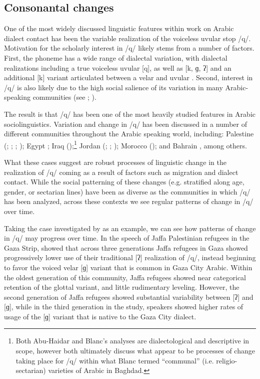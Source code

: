 \documentclass[output=paper]{langsci/langscibook}
\begin{document}
 
 \subsection{Consonantal changes}


One of the most widely discussed linguistic features within work on Arabic dialect contact has been the variable realization of the voiceless uvular stop /q/. Motivation for the scholarly interest in /q/ likely stems from a number of factors. First, the phoneme has a wide range of dialectal variation, with dialectal realizations including a true voiceless uvular [q], as well as [k, ɡ, ʔ] and an additional [k] variant articulated between a velar and uvular \citep{Shahin2011}. Second, interest in /q/ is also likely due to the high social salience of its variation in many Arabic-speaking communities (see \citealt{Hachimi2012}; \citealt{CotterHoresh2015}). 

  The result is that /q/ has been one of the most heavily studied features in Arabic sociolinguistics. Variation and change in /q/ has been discussed in a number of different communities throughout the Arabic speaking world, including: Palestine (\citealt{AbdEl-Jawad1987}; \citealt{Al-Shareef2002}; \citealt{CotterHoresh2015}; \citealt{Cotter2016}); Egypt \citep{Haeri1997}; Iraq (\citealt{Blanc1964,Abu-Haidar1991});\footnote{Both Abu-Haidar and Blanc’s analyses are dialectological and descriptive in scope, however both ultimately discuss what appear to be processes of change taking place for /q/ within what Blanc termed “communal” (i.e. religio-sectarian) varieties of Arabic in Baghdad.}  Jordan (\citealt{AbdEl-Jawad1981}; \citealt{Al-Wer2007}; \citealt{Al-WerHerin2011}); Morocco (\citealt{Hachimi2007,Hachimi2012}); and Bahrain \citep{Holes1987}, among others. 

  What these cases suggest are robust processes of linguistic change in the realization of /q/ coming as a result of factors such as migration and dialect contact. While the social patterning of these changes (e.g. stratified along age, gender, or sectarian lines) have been as diverse as the communities in which /q/ has been analyzed, across these contexts we see regular patterns of change in /q/ over time. 

  Taking the case investigated by \citet{Cotter2016} as an example, we can see how patterns of change in /q/ may progress over time. In the speech of Jaffa Palestinian refugees in the Gaza Strip, \citet{Cotter2016} showed that across three generations Jaffa refugees in Gaza showed progressively lower use of their traditional [ʔ] realization of /q/, instead beginning to favor the voiced velar [ɡ] variant that is common in Gaza City Arabic. Within the oldest generation of this community, Jaffa refugees showed near categorical retention of the glottal variant, and little rudimentary leveling. However, the second generation of Jaffa refugees showed substantial variability between [ʔ] and [ɡ], while in the third generation in the study, speakers showed higher rates of usage of the [ɡ] variant that is native to the Gaza City dialect. 
\end{document}
